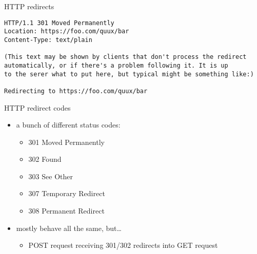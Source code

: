 \begin{frame}[fragile]{HTTP redirects}
\begin{Verbatim}
HTTP/1.1 301 Moved Permanently
Location: https://foo.com/quux/bar
Content-Type: text/plain

(This text may be shown by clients that don't process the redirect
automatically, or if there's a problem following it. It is up
to the serer what to put here, but typical might be something like:)

Redirecting to https://foo.com/quux/bar
\end{Verbatim}
\end{frame}

\begin{frame}{HTTP redirect codes}
    \begin{itemize}
    \item a bunch of different status codes:
        \begin{itemize}
        \item 301 Moved Permanently
        \item 302 Found
        \item 303 See Other
        \item 307 Temporary Redirect
        \item 308 Permanent Redirect
        \end{itemize}
    \item mostly behave all the same, but\ldots
        \begin{itemize}
        \item POST request receiving 301/302 redirects into GET request
        \end{itemize}
    \end{itemize}
\end{frame}
